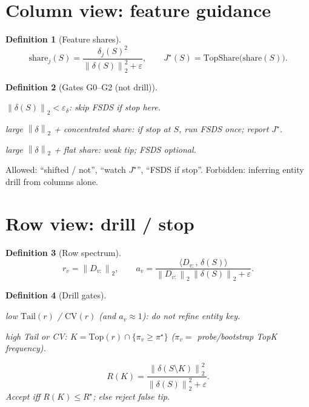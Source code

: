 \documentclass[11pt]{article}
\newtheorem{definition}{Definition}
\newcommand{\norm}[1]{\left\|#1\right\|_2}
\begin{document}
\section{Column view: feature guidance}
\label{sec:cols}

\begin{definition}[Feature shares]
\[
  \mathrm{share}_j(S)
  =\frac{\delta_j(S)^2}{\norm{\delta(S)}^2+\varepsilon},
  \qquad
  J^\star(S)=\mathrm{TopShare}\bigl(\mathrm{share}(S)\bigr).
\]
\end{definition}

\begin{definition}[Gates G0--G2 (not drill)]
\begin{description}[leftmargin=2.2em]
  \item[G0] $\norm{\delta(S)}<\varepsilon_\delta$: skip FSDS if stop here.
  \item[G1] large $\norm{\delta}$ + concentrated share:
    if stop at $S$, run FSDS once; report $J^\star$.
  \item[G2] large $\norm{\delta}$ + flat share: weak tip; FSDS optional.
\end{description}
\end{definition}
\noindent
Allowed: ``shifted / not'', ``watch $J^\star$'', ``FSDS if stop''.
Forbidden: inferring entity drill from columns alone.

\section{Row view: drill / stop}
\label{sec:rows}

\begin{definition}[Row spectrum]
\[
  r_v=\norm{D_{v:}},
  \qquad
  a_v=\frac{\langle D_{v:},\,\delta(S)\rangle}
           {\norm{D_{v:}}\,\norm{\delta(S)}+\varepsilon}.
\]
\end{definition}

\begin{definition}[Drill gates]
\begin{description}[leftmargin=2.8em]
  \item[D-stop] low $\mathrm{Tail}(r)$ / $\mathrm{CV}(r)$
    (and $a_v\approx 1$): do not refine entity key.
  \item[D-drill] high Tail or CV:
    $K=\mathrm{Top}(r)\cap\{\pi_v\ge\pi^\star\}$
    ($\pi_v=$ probe/bootstrap TopK frequency).
  \item[D-check]
    \[
      R(K)
      =\frac{\norm{\delta(S\setminus K)}^2}{\norm{\delta(S)}^2+\varepsilon}.
    \]
    Accept iff $R(K)\le R^\star$; else reject false tip.
\end{description}
\end{definition}
\end{document}

